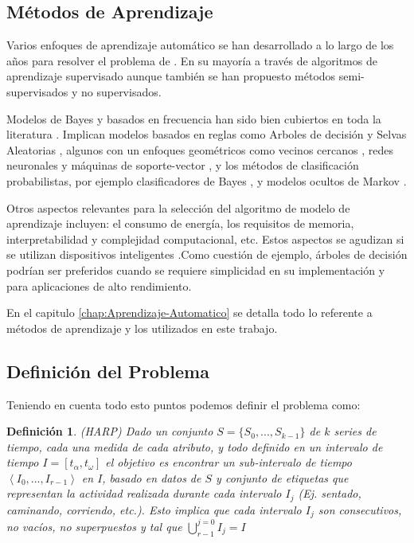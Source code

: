 \subsection{Métodos de Aprendizaje}

Varios enfoques de aprendizaje automático se han desarrollado a lo
largo de los años para resolver el problema de . En su
mayoría a través de algoritmos de aprendizaje supervisado aunque también
se han propuesto métodos semi-supervisados y no supervisados.

Modelos de Bayes y basados en frecuencia han sido bien cubiertos en
toda la literatura . Implican modelos basados en reglas
como Arboles de decisión  y Selvas Aleatorias ,
algunos con un enfoques geométricos como vecinos cercanos ,
redes neuronales  y máquinas de soporte-vector ,
y los métodos de clasificación probabilistas, por ejemplo clasificadores
de Bayes , y modelos ocultos de Markov .

Otros aspectos relevantes para la selección del algoritmo de modelo
de aprendizaje incluyen: el consumo de energía, los requisitos de
memoria, interpretabilidad y complejidad computacional, etc. Estos
aspectos se agudizan si se utilizan dispositivos inteligentes .Como
cuestión de ejemplo, árboles de decisión podrían ser preferidos cuando
se requiere simplicidad en su implementación y  para aplicaciones
de alto rendimiento\cite{ReyesOrtiz2015}.

En el capitulo \ref{chap:Aprendizaje-Automatico} se detalla todo
lo referente a métodos de aprendizaje y los utilizados en este trabajo.

\subsection{Definición del Problema}

Teniendo en cuenta todo esto puntos podemos definir el problema como:

\newtheorem{defi}{Definición}

\begin{defi}(HARP) Dado un conjunto $S=\{S_{0},...,S_{k-1}\}$ de
$k$ series de tiempo, cada una medida de cada atributo, y todo definido
en un intervalo de tiempo $I=\left[t_{\alpha},t_{\omega}\right]$
el objetivo es encontrar un sub-intervalo de tiempo $\left\langle I_{0},...,I_{r-1}\right\rangle $
en $I$, basado en datos de $S$ y conjunto de etiquetas que representan
la actividad realizada durante cada intervalo $I_{j}$ (Ej. sentado,
caminando, corriendo, etc.). Esto implica que cada intervalo $I_{j}$
son consecutivos, no vacíos, no superpuestos y tal que ${\displaystyle \bigcup_{r-1}^{j=0}{I_{j}=I}}$
\end{defi}

